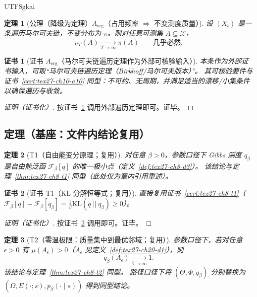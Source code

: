 \documentclass[12pt]{article}
\newtheorem{theorem}{定理}[section]
\newtheorem{Certificate}{证书}[section]
\begin{document}
\begin{CJK*}{UTF8}{gkai}
\begin{theorem}[公理（降级为定理）$A_{\mathrm{erg}}$（占用频率 $\Rightarrow$ 不变测度质量）]
\label{thm:tex27-ch20-aerg}
设 $(X_t)$ 是一条遍历马尔可夫链，不变分布为 $\pi$。则对任意可测集 $A\subseteq\mathcal{X}$，
\[
  \nu_T(A)\xrightarrow[T\to\infty]{}\pi(A)\qquad\text{几乎必然}.
\]
\end{theorem}

\begin{Certificate}[证书 $A_{\mathrm{erg}}$（马尔可夫链遍历定理作为外部可核验输入）]
\label{cert:tex27-ch20-aerg}
本条作为外部证书输入，可取“马尔可夫链遍历定理（Birkhoff/马尔可夫版本）”。
其可核验要件与证书~\ref{cert:tex27-ch10-a10} 同型：不可约、无周期，并满足适当的漂移/小集条件以确保遍历与收敛。
\end{Certificate}

\begin{proof}[证明（证书化）]
按证书~\ref{cert:tex27-ch20-aerg} 调用外部遍历定理即可。证毕。
\end{proof}

\subsection{定理（基座：文件内结论复用）}
\label{subsec:tex27-ch20-theorems}

\begin{theorem}[T1（自由能变分原理；复用）]
\label{thm:tex27-ch20-t1}
对任意 $\beta>0$，参数口径下 Gibbs 测度 $q_\beta$ 是自由能泛函 $\mathcal{F}_\beta[q]$ 的唯一极小点（定义~\ref{def:tex27-ch8-d3}）。
该结论与定理~\ref{thm:tex27-ch8-t1} 同型（此处仅为章内引用重述）。
\end{theorem}

\begin{Certificate}[证书 T1（KL 分解恒等式；复用）]
\label{cert:tex27-ch20-t1}
直接复用证书~\ref{cert:tex27-ch8-t1}（$\mathcal{F}_\beta[q]-\mathcal{F}_\beta[q_\beta]=\frac{1}{\beta}\mathrm{KL}(q\|q_\beta)
  \ge 0$）。
\end{Certificate}

\begin{proof}[证明（证书化）]
按证书~\ref{cert:tex27-ch20-t1} 调用即可。证毕。
\end{proof}

\begin{theorem}[T2（零温极限：质量集中到最优邻域；复用）]
\label{thm:tex27-ch20-t2}
参数口径下，若对任意 $\epsilon>0$ 有 $\mu(A_\epsilon)>0$（$A_\epsilon$ 见定义~\ref{def:tex27-ch20-d1}），则
\[
  q_\beta(A_\epsilon)\xrightarrow[\beta\to\infty]{}1.
\]
该结论与定理~\ref{thm:tex27-ch8-t2} 同型。
路径口径下将 $(\Theta,\Phi,q_\beta)$ 分别替换为 $(\Omega,E(\cdot;s),p_\beta(\cdot\mid s))$ 得到同型结论。
\end{theorem}


\end{CJK*}
\end{document}
